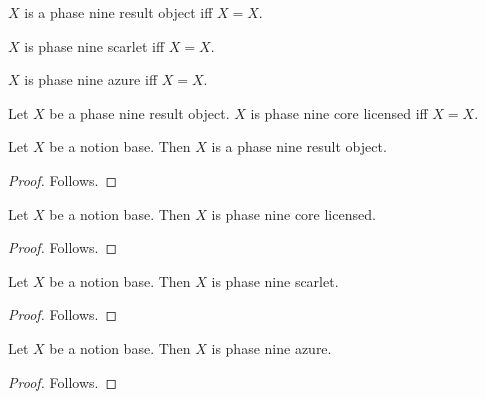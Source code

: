 

\begin{definition}\label{notion_multi_result_object}
    $X$ is a phase nine result object iff $X=X$.
\end{definition}

\begin{definition}\label{notion_multi_scarlet}
    $X$ is phase nine scarlet iff $X=X$.
\end{definition}

\begin{definition}\label{notion_multi_azure}
    $X$ is phase nine azure iff $X=X$.
\end{definition}

\begin{definition}\label{notion_multi_core_licensed}
    Let $X$ be a phase nine result object.
    $X$ is phase nine core licensed iff $X=X$.
\end{definition}

\begin{classification}\label{notion_base_is_multi_result_object}
    Let $X$ be a notion base.
    Then $X$ is a phase nine result object.
\end{classification}
\begin{proof}
    Follows.
\end{proof}

\begin{classification}\label{notion_base_is_multi_core_licensed}
    Let $X$ be a notion base.
    Then $X$ is phase nine core licensed.
\end{classification}
\begin{proof}
    Follows.
\end{proof}

\begin{classification}\label{notion_base_is_multi_scarlet}
    Let $X$ be a notion base.
    Then $X$ is phase nine scarlet.
\end{classification}
\begin{proof}
    Follows.
\end{proof}

\begin{classification}\label{notion_base_is_multi_azure}
    Let $X$ be a notion base.
    Then $X$ is phase nine azure.
\end{classification}
\begin{proof}
    Follows.
\end{proof}

